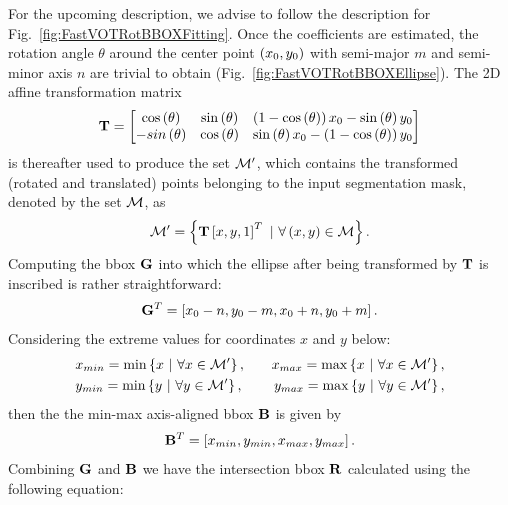 For the upcoming description, we advise to follow the description for Fig.~\ref{fig:FastVOTRotBBOXFitting}. Once the coefficients are estimated, the rotation angle $\theta$ around the center point $\left( {x_0, y_0} \right)$ with semi-major $m$ and semi-minor axis $n$ are trivial to obtain (Fig.~\ref{fig:FastVOTRotBBOXEllipse}). The 2D affine transformation matrix
\begin{equation}
    \mathbf{T} =
    \begin{bmatrix}
        {\cos} \left( \theta \right) &
        {\sin} \left( \theta \right) &
        \left( {1 - {\cos} \left( \theta \right)} \right)x_0 - {\sin} \left( \theta \right) y_0\\
        -{sin} \left( \theta \right) &
        {\cos} \left( \theta \right) &
        {\sin} \left( \theta \right) x_0 - \left( {1 - {\cos} \left( \theta \right)} \right) y_0
    \end{bmatrix}
\end{equation}
is thereafter used to produce the set $\mathcal{M'}$, which contains the transformed (rotated and translated) points belonging to the input segmentation mask, denoted by the set $\mathcal{M}$, as
\begin{equation}
    \mathcal{M'} =
    \left\{ {
        \mathbf{T}
        \left[ {x, y, 1} \right]^T
        \ | \
        \forall \left( {x, y} \right) \in \mathcal{M}
    } \right\}.
\end{equation}
Computing the \gls{bbox} $\mathbf{G}$ into which the ellipse after being transformed by $\mathbf{T}$ is inscribed is rather straightforward:
\begin{equation}
    {\mathbf{G}}^T = \left[ {x_0 - n, y_0 - m, x_0 + n, y_0 + m} \right].
\end{equation}
Considering the extreme values for coordinates $x$ and $y$ below:
\begin{equation}
    \begin{aligned}
        &x_{min} = \min \left\{ {x\ |\ \forall x \in \mathcal{M'}} \right\},
        \quad
        &x_{max} = \max \left\{ {x\ |\ \forall x \in \mathcal{M'}} \right\},\\
        &y_{min} = \min \left\{ {y\ |\ \forall y \in \mathcal{M'}} \right\},
        \quad
        &y_{max} = \max \left\{ {y\ |\ \forall y \in \mathcal{M'}} \right\},
    \end{aligned}
\end{equation}
then the the min-max axis-aligned \gls{bbox} $\mathbf{B}$ is given by
\begin{equation}
    {\mathbf{B}}^T = \left[ {x_{min}, y_{min}, x_{max}, y_{max}} \right].
\end{equation}
Combining $\mathbf{G}$ and $\mathbf{B}$ we have the intersection \gls{bbox} $\mathbf{R}$ calculated using the following equation:
